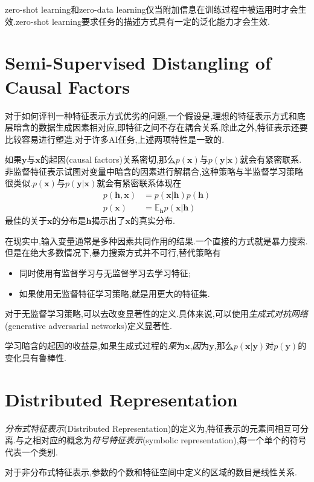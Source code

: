 zero-shot learning和zero-data learning仅当附加信息在训练过程中被运用时才会生效.zero-shot learning要求任务的描述方式具有一定的泛化能力才会生效.

\section{Semi-Supervised Distangling of Causal Factors}

对于如何评判一种特征表示方式优劣的问题,一个假设是,理想的特征表示方式和底层暗含的数据生成因素相对应,即特征之间不存在耦合关系.除此之外,特征表示还要比较容易进行塑造.对于许多AI任务,上述两项特性是一致的.

如果$\bm y$与$\bm x$的起因(causal factors)关系密切,那么$p(\bm x)$与$p(\bm{y|x})$就会有紧密联系.非监督特征表示试图对变量中暗含的因素进行解耦合,这种策略与半监督学习策略很类似.$p(\bm x)$与$p(\bm{y|x})$就会有紧密联系体现在
\begin{equation}\begin{split}
p(\bm {h,x})&=p(\bm{x|h})p(\bm h)\\
p(\bm x)&=\mathbb E_{\bm h}p(\bm{x|h})
\end{split}\end{equation}
最佳的关于$\bm x$的分布是$\bm h$揭示出了$\bm x$的真实分布.

在现实中,输入变量通常是多种因素共同作用的结果.一个直接的方式就是暴力搜索.但是在绝大多数情况下,暴力搜索方式并不可行,替代策略有
\begin{itemize}
    \item 同时使用有监督学习与无监督学习去学习特征;
    \item 如果使用无监督特征学习策略,就是用更大的特征集.
\end{itemize}

对于无监督学习策略,可以去改变显著性的定义.具体来说,可以使用\textit{生成式对抗网络}(generative adversarial networks)定义显著性.

学习暗含的起因的收益是,如果生成式过程的\textit{果}为$\bm x$,\textit{因}为$\bm y$,那么$p(\bm{x|y})$对$p(\bm y)$的变化具有鲁棒性.

\section{Distributed Representation}

\textit{分布式特征表示}(Distributed Representation)的定义为,特征表示的元素间相互可分离.与之相对应的概念为\textit{符号特征表示}(symbolic representation),每一个单个的符号代表一个类别.

对于非分布式特征表示,参数的个数和特征空间中定义的区域的数目是线性关系.

